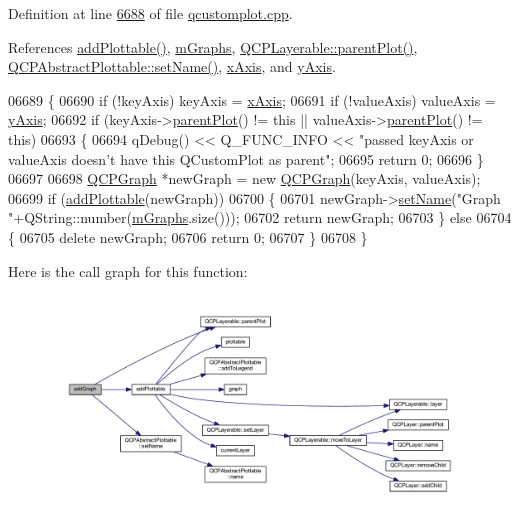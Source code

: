 Definition at line \hyperlink{a00115_source_l06688}{6688} of file \hyperlink{a00115_source}{qcustomplot.\+cpp}.



References \hyperlink{a00115_source_l06487}{add\+Plottable()}, \hyperlink{a00116_source_l02116}{m\+Graphs}, \hyperlink{a00116_source_l00329}{Q\+C\+P\+Layerable\+::parent\+Plot()}, \hyperlink{a00115_source_l08378}{Q\+C\+P\+Abstract\+Plottable\+::set\+Name()}, \hyperlink{a00116_source_l02076}{x\+Axis}, and \hyperlink{a00116_source_l02076}{y\+Axis}.


\begin{DoxyCode}
06689 \{
06690   \textcolor{keywordflow}{if} (!keyAxis) keyAxis = \hyperlink{a00116_a384438707adbcc96b0fa1324106f7129}{xAxis};
06691   \textcolor{keywordflow}{if} (!valueAxis) valueAxis = \hyperlink{a00116_af168096ce67002b1fbce18ae5dd1b652}{yAxis};
06692   \textcolor{keywordflow}{if} (keyAxis->\hyperlink{a00044_ab7e0e94461566093d36ffc0f5312b109}{parentPlot}() != \textcolor{keyword}{this} || valueAxis->\hyperlink{a00044_ab7e0e94461566093d36ffc0f5312b109}{parentPlot}() != \textcolor{keyword}{this})
06693   \{
06694     qDebug() << Q\_FUNC\_INFO << \textcolor{stringliteral}{"passed keyAxis or valueAxis doesn't have this QCustomPlot as parent"};
06695     \textcolor{keywordflow}{return} 0;
06696   \}
06697   
06698   \hyperlink{a00031}{QCPGraph} *newGraph = \textcolor{keyword}{new} \hyperlink{a00031}{QCPGraph}(keyAxis, valueAxis);
06699   \textcolor{keywordflow}{if} (\hyperlink{a00116_ab7ad9174f701f9c6f64e378df77927a6}{addPlottable}(newGraph))
06700   \{
06701     newGraph->\hyperlink{a00024_ab79c7ba76bc7fa89a4b3580e12149f1f}{setName}(\textcolor{stringliteral}{"Graph "}+QString::number(\hyperlink{a00116_a54ed2081d9366a6c2137bf9d9f7b8371}{mGraphs}.size()));
06702     \textcolor{keywordflow}{return} newGraph;
06703   \} \textcolor{keywordflow}{else}
06704   \{
06705     \textcolor{keyword}{delete} newGraph;
06706     \textcolor{keywordflow}{return} 0;
06707   \}
06708 \}
\end{DoxyCode}


Here is the call graph for this function\+:
\nopagebreak
\begin{figure}[H]
\begin{center}
\leavevmode
\includegraphics[width=350pt]{d4/d3e/a00116_a6fb2873d35a8a8089842d81a70a54167_cgraph}
\end{center}
\end{figure}


